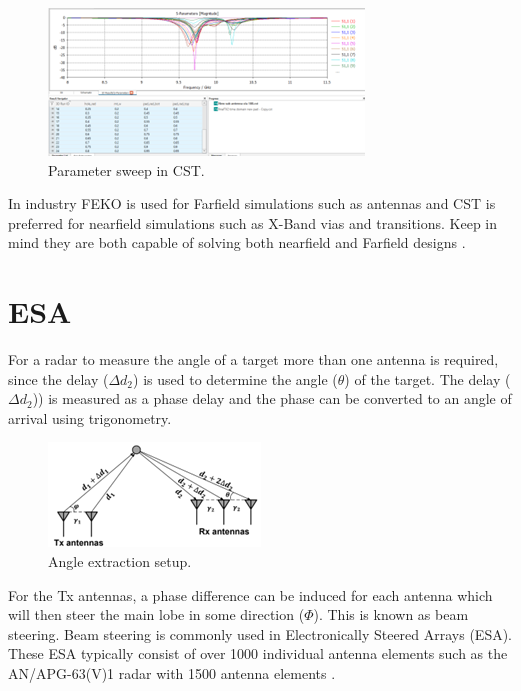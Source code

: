     \begin{figure}[H]
    \centering
    \includegraphics[width=0.85\linewidth]{Figures/chp2_CST_parameter_sweep.png}
    \caption{Parameter sweep in CST.}
    \label{fig:chp2_CST_parameter_sweep}
    \end{figure}

In industry FEKO is used for Farfield simulations such as antennas and CST is preferred for nearfield simulations such as X-Band vias and transitions. Keep in mind they are both capable of solving both nearfield and Farfield designs .

\section{ESA}
For a radar to measure the angle of a target more than one antenna is required, since the delay (\(\Delta d_{2}\)) is used to determine the angle (\(\theta\)) of the target. The delay (\(\Delta d_{2}\))) is measured as a phase delay and the phase can be converted to an angle of arrival using trigonometry. 

    \begin{figure}[H]
    \centering
    \includegraphics[width=0.4\linewidth]{Figures/chp2_angle_extraction.png}
    \caption{Angle extraction setup.}
    \label{fig:chp2_angle_extraction}
    \end{figure}

For the Tx antennas, a phase difference can be induced for each antenna which will then steer the main lobe in some direction (\(\Phi\)). This is known as beam steering. Beam steering is commonly used in Electronically Steered Arrays (ESA). These ESA typically consist of over 1000 individual antenna elements such as the AN/APG-63(V)1 radar with 1500 antenna elements \cite{reflectarrayy}.

